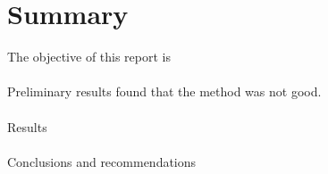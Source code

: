 \chapter{Summary}
	\noindent
	The objective of this report is \\
	\\
	Preliminary results found that the method was not good.\\ 
	\\
	Results\\
	\\
	Conclusions and recommendations\\

%
%

